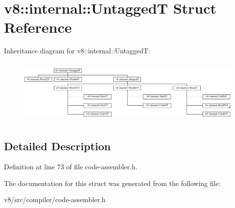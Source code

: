 \hypertarget{structv8_1_1internal_1_1UntaggedT}{}\section{v8\+:\+:internal\+:\+:UntaggedT Struct Reference}
\label{structv8_1_1internal_1_1UntaggedT}
Inheritance diagram for v8\+:\+:internal\+:\+:UntaggedT\+:\begin{figure}[H]
\begin{center}
\leavevmode
\includegraphics[height=3.243243cm]{structv8_1_1internal_1_1UntaggedT}
\end{center}
\end{figure}


\subsection{Detailed Description}


Definition at line 73 of file code-\/assembler.\+h.



The documentation for this struct was generated from the following file\+:\begin{DoxyCompactItemize}
\item 
v8/src/compiler/code-\/assembler.\+h\end{DoxyCompactItemize}
